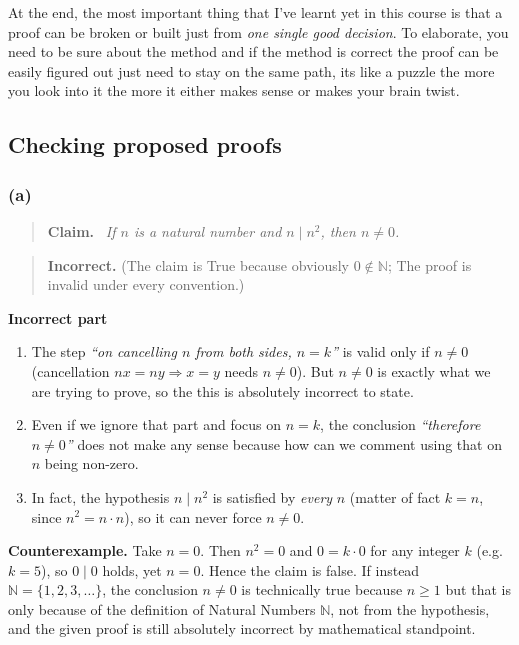\documentclass[11pt,a4paper]{article}
\newcommand{\N}{\mathbb{N}}
\newenvironment{claimbox}[1][]{\par\smallskip\begin{quote}\textbf{#1.}\ \itshape}{\end{quote}}
\newenvironment{verdictbox}[2][]{\par\begin{quote}}{\end{quote}}
\theoremstyle{definition}
\newcommand{\badmark}{\textbf{Incorrect.}}
\begin{document}
At the end, the most important thing that I've learnt yet in this course is that a proof can be broken or built just from \emph{one single good decision}. 
To elaborate, you need to be sure about the method and if the method is correct the proof can be easily figured out just need to stay on the same path, 
its like a puzzle the more you look into it the more it either makes sense or makes your brain twist.

\subsection{Checking proposed proofs}








\subsubsection*{(a)}
\begin{claimbox}[Claim]
If $n$ is a natural number and $n\mid n^2$, then $n\neq0$.
\end{claimbox}

\begin{verdictbox}{badred}
\badmark{} (The claim is True because obviously $0\notin\N$; The proof is invalid under every convention.)
\end{verdictbox}

\textbf{Incorrect part}
\begin{enumerate}
  \item The step \emph{``on cancelling $n$ from both sides, $n=k$''} is valid only if $n\neq0$ (cancellation
        $nx=ny\Rightarrow x=y$ needs $n\ne0$). But $n\neq0$ is exactly what we are trying to prove, so the this is absolutely incorrect to state.
  \item Even if we ignore that part and focus on $n=k$, the conclusion \emph{``therefore $n\neq 0$''} does not make any sense because how can we comment using that on $n$ being non-zero.
  \item In fact, the hypothesis $n\mid n^2$ is satisfied by \emph{every} $n$ (matter of fact $k=n$, since $n^2=n\cdot n$), so it can never force $n\ne0$.
\end{enumerate}

\textbf{Counterexample.} Take $n=0$. Then $n^2=0$ and $0=k\cdot 0$ for any integer $k$ (e.g.\ $k=5$), so $0\mid 0$ holds, yet $n=0$.
Hence the claim is false.
If instead $\N=\{1,2,3,\dots\}$, the conclusion $n\neq0$ is technically true because $n\ge1$ but that is only because of the definition of Natural Numbers $\N$, not from the hypothesis, and the given proof is still absolutely incorrect by 
mathematical standpoint.\\
\end{document}
